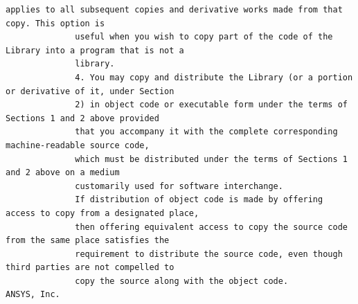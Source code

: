 \begin{lstlisting}[basicstyle=\ttfamily\scriptsize,breaklines=true]
              applies to all subsequent copies and derivative works made from that copy. This option is
              useful when you wish to copy part of the code of the Library into a program that is not a
              library.
              4. You may copy and distribute the Library (or a portion or derivative of it, under Section
              2) in object code or executable form under the terms of Sections 1 and 2 above provided
              that you accompany it with the complete corresponding machine-readable source code,
              which must be distributed under the terms of Sections 1 and 2 above on a medium
              customarily used for software interchange.
              If distribution of object code is made by offering access to copy from a designated place,
              then offering equivalent access to copy the source code from the same place satisfies the
              requirement to distribute the source code, even though third parties are not compelled to
              copy the source along with the object code.
ANSYS, Inc.


\end{lstlisting}

